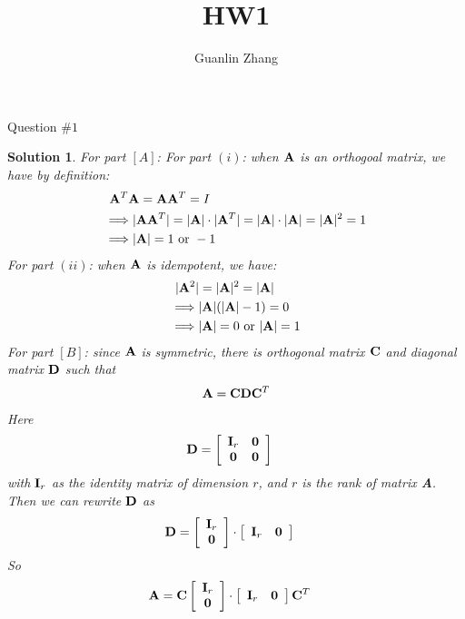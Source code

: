 \documentclass[11pt]{article}\usepackage[]{graphicx}\usepackage[]{color}
\title{HW1}
\author{Guanlin Zhang}
\newtheorem{sol}{Solution}
\begin{document}
Question $\# 1$
\begin{sol}
	For part $[A]$:
	For part $(i)$:\vskip 2mm
	when ${\bf A}$ is an orthogoal matrix, we have by definition:
	\begin{align*}
		&\ {\bf A}^T{\bf A} = {\bf A}{\bf A}^T = I\\
		&\Longrightarrow |{\bf A}{\bf A}^T| = |{\bf A}|\cdot |{\bf A}^T| = |{\bf A}|\cdot |{\bf A}| = |{\bf A}|^2 = 1\\
		&\Longrightarrow |{\bf A}| = 1 \text{ or } -1
	\end{align*}
	For part $(ii)$:\vskip 2mm
	when ${\bf A}$ is idempotent, we have:
	\begin{align*}
		&\ |{\bf A}^2| = |{\bf A}|^2 = |{\bf A}|\\
		&\Longrightarrow |{\bf A}|(|{\bf A}| - 1) = 0\\
		&\Longrightarrow |{\bf A}| = 0 \text{ or }|{\bf A}| = 1
	\end{align*}
	For part $[B]$:\vskip 2mm
	since ${\bf A}$ is symmetric, there is orthogonal matrix ${\bf C}$ and diagonal matrix ${\bf D}$ such that
	\begin{align*}
		{\bf A} ={\bf C} {\bf D}{\bf C}^T
	\end{align*}
	Here
	\begin{align*}
		{\bf D} &= \left[\begin{array}{cc} {\bf I}_r& {\bf 0}\\ {\bf 0}& {\bf 0}\end{array}\right]
	\end{align*}
	with ${\bf I}_r$ as the identity matrix of dimension $r$, and $r$ is the rank of matrix {\bf A}.\vskip 2mm
	Then we can rewrite ${\bf D}$ as
	\begin{align*}
		{\bf D} &= \left[\begin{array}{c}{\bf I}_r\\ {\bf 0}\end{array}\right]\cdot \left[\begin{array}{cc} {\bf I}_r& {\bf 0}\end{array}\right]
	\end{align*}
	So 
	\begin{align*}
		{\bf A} &= {\bf C}\left[\begin{array}{c}{\bf I}_r\\ {\bf 0}\end{array}\right]\cdot \left[\begin{array}{cc} {\bf I}_r& {\bf 0}\end{array}\right]{\bf C}^T

\end{align*}
\end{sol}
\end{document}
